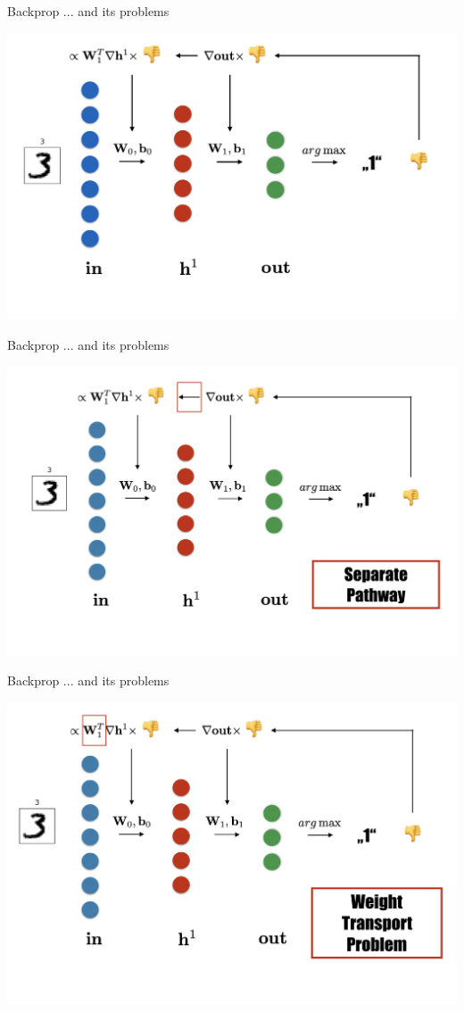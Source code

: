 \documentclass[dvipsnames, usenames]{beamer}
\begin{document}
\begin{frame}[noframenumbering]{Backprop ... and its problems}

\centering 
\includegraphics[width=1.1\textwidth]{../figures/report/bp_2}
\end{frame}

\begin{frame}[noframenumbering]{Backprop ... and its problems}

\centering 
\includegraphics[width=1.1\textwidth]{../figures/report/bp_3}
\end{frame}

\begin{frame}[noframenumbering]{Backprop ... and its problems}

\centering 
\includegraphics[width=1.1\textwidth]{../figures/report/bp_4}
\end{frame}
\end{document}
